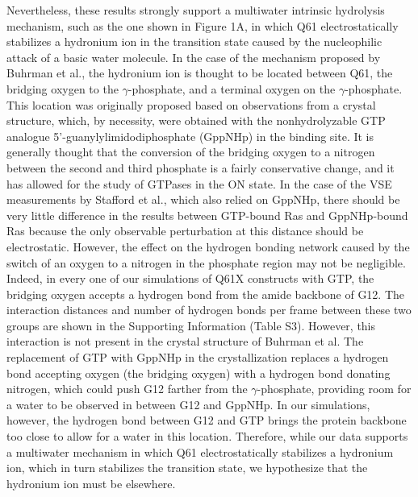 Nevertheless, these results strongly support a multiwater intrinsic hydrolysis mechanism, such as the one shown in Figure 1A, in which Q61 electrostatically stabilizes a hydronium ion in the transition state caused by the nucleophilic attack of a basic water molecule. 
In the case of the mechanism proposed by Buhrman et al., the hydronium ion is thought to be located between Q61, the bridging oxygen to the $\gamma$-phosphate, and a terminal oxygen on the $\gamma$-phosphate. 
This location was originally proposed based on observations from a crystal structure, which, by necessity, were obtained with the nonhydrolyzable GTP analogue 5'-guanylylimidodiphosphate (GppNHp) in the binding site. 
It is generally thought that the conversion of the bridging oxygen to a nitrogen between the second and third phosphate is a fairly conservative change, and it has allowed for the study of GTPases in the ON state. 
In the case of the VSE measurements by Stafford et al., which also relied on GppNHp, there should be very little difference in the results between GTP-bound Ras and GppNHp-bound Ras because the only observable perturbation at this distance should be electrostatic. 
However, the effect on the hydrogen bonding network caused by the switch of an oxygen to a nitrogen in the phosphate region may not be negligible. 
Indeed, in every one of our simulations of Q61X constructs with GTP, the bridging oxygen accepts a hydrogen bond from the amide backbone of G12. 
The interaction distances and number of hydrogen bonds per frame between these two groups are shown in the Supporting Information (Table S3). 
However, this interaction is not present in the crystal structure of Buhrman et al. 
The replacement of GTP with GppNHp in the crystallization replaces a hydrogen bond accepting oxygen (the bridging oxygen) with a hydrogen bond donating nitrogen, which could push G12 farther from the $\gamma$-phosphate, providing room for a water to be observed in between G12 and GppNHp. 
In our simulations, however, the hydrogen bond between G12 and GTP brings the protein backbone too close to allow for a water in this location. 
Therefore, while our data supports a multiwater mechanism in which Q61 electrostatically stabilizes a hydronium ion, which in turn stabilizes the transition state, we hypothesize that the hydronium ion must be elsewhere.

